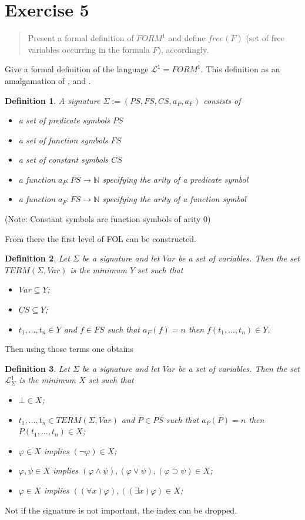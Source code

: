 \documentclass[11pt,a4paper]{article}
\newtheorem{mydef}{Definition}
\begin{document}
\section*{Exercise 5}
\begin{quote}
Present a formal definition of $FORM^1$ and define $free(F)$ (set of free variables occurring in the formula $F$), accordingly.
\end{quote}

Give a formal definition of the language $\mathcal{L}^1=FORM^1$. This definition as an amalgamation of 
\cite{LoCo}, \cite{kbs} and \cite{comp}.

\begin{mydef}
A signature  $\Sigma:=(PS,FS,CS,a_P,a_F)$ consists of 
\begin{itemize}
\item a set of predicate symbols $PS$
\item a set of function symbols $FS$
\item a set of constant symbols $CS$
\item a function $a_P:PS \to \mathbb{N}$ specifying the arity of a predicate symbol
\item a function $a_F:FS \to \mathbb{N}$ specifying the arity of a function symbol
\end{itemize}
\end{mydef}

(Note: Constant symbols are function symbols of arity 0)


From there the first level of FOL can be constructed.

\begin{mydef}
Let $\Sigma$ be a signature and let $Var$ be a set of variables.
Then the set $\mathit{TERM}(\Sigma,Var)$ is the minimum $Y$ set such that
\begin{itemize}
\item $Var \subseteq Y$;
\item $CS \subseteq Y$;
\item $t_1,\dots,t_n \in Y$ and $f \in FS$ such that $a_F(f)=n$ then $f(t_1,\dots,t_n)\in Y$.
\end{itemize}
\end{mydef}

Then using those terms one obtains

\begin{mydef}
Let $\Sigma$ be a signature and let $Var$ be a set of variables. 
Then the set $\mathcal{L}_{\Sigma}	^1$ is the minimum $X$ set such that
\begin{itemize}
\item $\bot \in X$;
\item $t_1,\dots,t_n \in TERM(\Sigma,Var)$ and $P \in PS$ such that $a_P(P)=n$ then $P(t_1,\dots,t_n)\in X$;
\item $\varphi \in X$ implies $(\neg \varphi) \in X$;
\item $\varphi, \psi \in X$ implies $(\varphi \land \psi),(\varphi \lor \psi),(\varphi \supset \psi) \in X$;
\item $\varphi \in X$ implies $((\forall x) \varphi),((\exists  x) \varphi) \in X$;
\end{itemize}
\end{mydef}
Not if the signature is not important, the index can be dropped.
\end{document}
